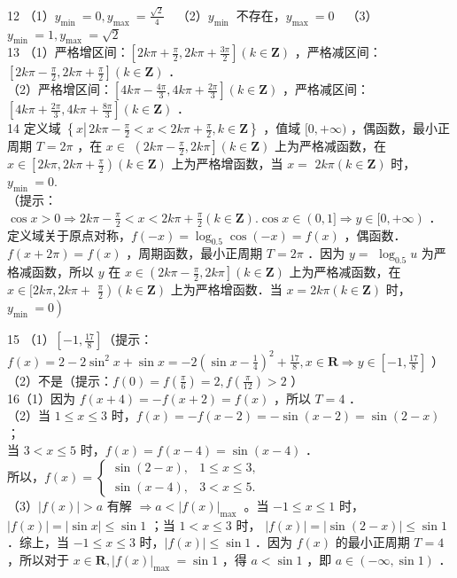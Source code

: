 \documentclass[10pt]{article}
\begin{document}
12 （1）\(y_{\text {min }}=0, y_{\text {max }}=\frac{\sqrt{2}}{4} \quad\)（2）\(y_{\text {min }}\) 不存在，\(y_{\text {max }}=0 \quad\)（3）\(y_{\text {min }}=1, y_{\text {max }}=\sqrt{2}\)\\
13 （1）严格增区间：\(\left[2 k \pi+\frac{\pi}{2}, 2 k \pi+\frac{3 \pi}{2}\right](k \in \mathbf{Z})\) ，严格减区间：\(\left[2 k \pi-\frac{\pi}{2}, 2 k \pi+\frac{\pi}{2}\right](k \in \mathbf{Z})\) ．\\
（2）严格增区间：\(\left[4 k \pi-\frac{4 \pi}{3}, 4 k \pi+\frac{2 \pi}{3}\right](k \in \mathbf{Z})\) ，严格减区间：\(\left[4 k \pi+\frac{2 \pi}{3}, 4 k \pi+\frac{8 \pi}{3}\right](k \in \mathbf{Z})\) ．\\
14 定义域 \(\left\{x \left\lvert\, 2 k \pi-\frac{\pi}{2}<x<2 k \pi+\frac{\pi}{2}\right., k \in \mathbf{Z}\right\}\) ，值域 \([0,+\infty)\) ，偶函数，最小正周期 \(T=2 \pi\) ，在 \(x \in\) \(\left(2 k \pi-\frac{\pi}{2}, 2 k \pi\right](k \in \mathbf{Z})\) 上为严格减函数，在 \(x \in\left[2 k \pi, 2 k \pi+\frac{\pi}{2}\right)(k \in \mathbf{Z})\) 上为严格增函数，当 \(x=\) \(2 k \pi(k \in \mathbf{Z})\) 时，\(y_{\text {min }}=0\).\\
（提示： \(\cos x>0 \Rightarrow 2 k \pi-\frac{\pi}{2}<x<2 k \pi+\frac{\pi}{2}(k \in \mathbf{Z}) . \cos x \in(0,1] \Rightarrow y \in[0,+\infty)\) ．定义域关于原点对称，\(f(-x)=\log _{0.5} \cos (-x)=f(x)\) ，偶函数．\(f(x+2 \pi)=f(x)\) ，周期函数，最小正周期 \(T=2 \pi\) ．因为 \(y=\) \(\log _{0.5} u\) 为严格减函数，所以 \(y\) 在 \(x \in\left(2 k \pi-\frac{\pi}{2}, 2 k \pi\right](k \in \mathbf{Z})\) 上为严格减函数，在 \(x \in[2 k \pi, 2 k \pi+\) \(\left.\frac{\pi}{2}\right)(k \in \mathbf{Z})\) 上为严格增函数．当 \(x=2 k \pi(k \in \mathbf{Z})\) 时，\(\left.y_{\text {min }}=0\right)\)

15 （1）\(\left[-1, \frac{17}{8}\right]\)（提示：\(f(x)=2-2 \sin ^{2} x+\sin x=-2\left(\sin x-\frac{1}{4}\right)^{2}+\frac{17}{8}, x \in \mathbf{R} \Rightarrow y \in\left[-1, \frac{17}{8}\right]\) ）\\
（2）不是（提示：\(f(0)=f\left(\frac{\pi}{6}\right)=2, f\left(\frac{\pi}{12}\right)>2\) ）\\
16（1）因为 \(f(x+4)=-f(x+2)=f(x)\) ，所以 \(T=4\) ．\\
（2）当 \(1 \leqslant x \leqslant 3\) 时，\(f(x)=-f(x-2)=-\sin (x-2)=\sin (2-x)\) ；\\
当 \(3<x \leqslant 5\) 时，\(f(x)=f(x-4)=\sin (x-4)\) ．\\
所以，\(f(x)= \begin{cases}\sin (2-x), & 1 \leqslant x \leqslant 3, \\ \sin (x-4), & 3<x \leqslant 5 .\end{cases}\)\\
（3）\(|f(x)|>a\) 有解 \(\Rightarrow a<|f(x)|_{\text {max }}\) 。当 \(-1 \leqslant x \leqslant 1\) 时，\(|f(x)|=|\sin x| \leqslant \sin 1\) ；当 \(1<x \leqslant 3\) 时， \(|f(x)|=|\sin (2-x)| \leqslant \sin 1\) ．综上，当 \(-1 \leqslant x \leqslant 3\) 时，\(|f(x)| \leqslant \sin 1\) ．因为 \(f(x)\) 的最小正周期 \(T=4\) ，所以对于 \(x \in \mathbf{R},|f(x)|_{\text {max }}=\sin 1\) ，得 \(a<\sin 1\) ，即 \(a \in(-\infty, \sin 1)\) ．
\end{document}
